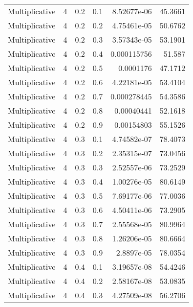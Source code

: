 \documentclass{article}
\begin{document}
\begin{longtable}[H]{lrrrrr}
 Multiplicative &       4 &   0.2 &            0.1 &   8.52677e-06 &         45.3661 \\
 Multiplicative &       4 &   0.2 &            0.2 &   4.75461e-05 &         50.6762 \\
 Multiplicative &       4 &   0.2 &            0.3 &   3.57343e-05 &         53.1901 \\
 Multiplicative &       4 &   0.2 &            0.4 &   0.000115756 &         51.587  \\
 Multiplicative &       4 &   0.2 &            0.5 &   0.0001176   &         47.1712 \\
 Multiplicative &       4 &   0.2 &            0.6 &   4.22181e-05 &         53.4104 \\
 Multiplicative &       4 &   0.2 &            0.7 &   0.000278445 &         54.3586 \\
 Multiplicative &       4 &   0.2 &            0.8 &   0.00040441  &         52.1618 \\
 Multiplicative &       4 &   0.2 &            0.9 &   0.00154803  &         55.1526 \\
 Multiplicative &       4 &   0.3 &            0.1 &   4.74582e-07 &         78.4073 \\
 Multiplicative &       4 &   0.3 &            0.2 &   2.35315e-07 &         73.0456 \\
 Multiplicative &       4 &   0.3 &            0.3 &   2.52557e-06 &         73.2529 \\
 Multiplicative &       4 &   0.3 &            0.4 &   1.00276e-05 &         80.6149 \\
 Multiplicative &       4 &   0.3 &            0.5 &   7.69177e-06 &         77.0036 \\
 Multiplicative &       4 &   0.3 &            0.6 &   4.50411e-06 &         73.2905 \\
 Multiplicative &       4 &   0.3 &            0.7 &   2.55568e-05 &         80.9964 \\
 Multiplicative &       4 &   0.3 &            0.8 &   1.26206e-05 &         80.6664 \\
 Multiplicative &       4 &   0.3 &            0.9 &   2.8897e-05  &         78.0354 \\
 Multiplicative &       4 &   0.4 &            0.1 &   3.19657e-08 &         54.4246 \\
 Multiplicative &       4 &   0.4 &            0.2 &   2.58167e-08 &         53.0835 \\
 Multiplicative &       4 &   0.4 &            0.3 &   4.27509e-08 &         56.2706 \\

\end{longtable}
\end{document}
